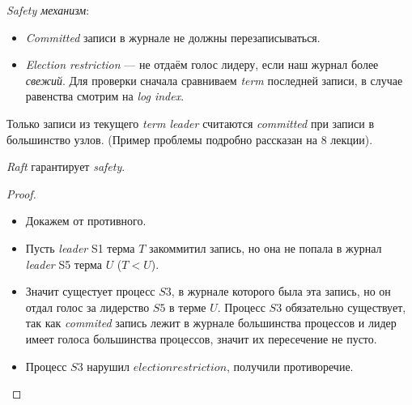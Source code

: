 \newpage
\begin{definition} \textit{Safety механизм}:
    \begin{itemize}
        \item \textit{Committed} записи в журнале не должны перезаписываться.
        \item \textit{Election restriction} --- не отдаём голос лидеру,
            если наш журнал более \textit{свежий}. Для проверки сначала сравниваем
            \textit{term} последней записи, в случае равенства смотрим на \textit{log index}.
    \end{itemize}
\end{definition}

\begin{remark}
    Только записи из текущего \textit{term leader} считаются
    \textit{committed} при записи в большинство узлов. (Пример проблемы подробно
    рассказан на 8 лекции).
\end{remark}

\begin{theorem}
    \textit{Raft} гарантирует \textit{safety}.
\end{theorem}
\begin{proof}
    \enewline
    \begin{itemize}
        \item Докажем от противного.
        \item Пусть \textit{leader} S1 терма $T$ закоммитил запись, но она не попала
            в журнал \textit{leader} S5 терма $U$ ($T < U$).
        \item Значит сущестует процесс $S3$, в журнале которого была эта запись, но
            он отдал голос за лидерство $S5$ в терме $U$. Процесс $S3$ обязательно существует,
            так как \textit{commited} запись лежит в журнале большинства процессов и лидер
            имеет голоса большинства процессов, значит их пересечение не пусто.
        \item Процесс $S3$ нарушил $election restriction$, получили противоречие.
    \end{itemize}
\end{proof}
